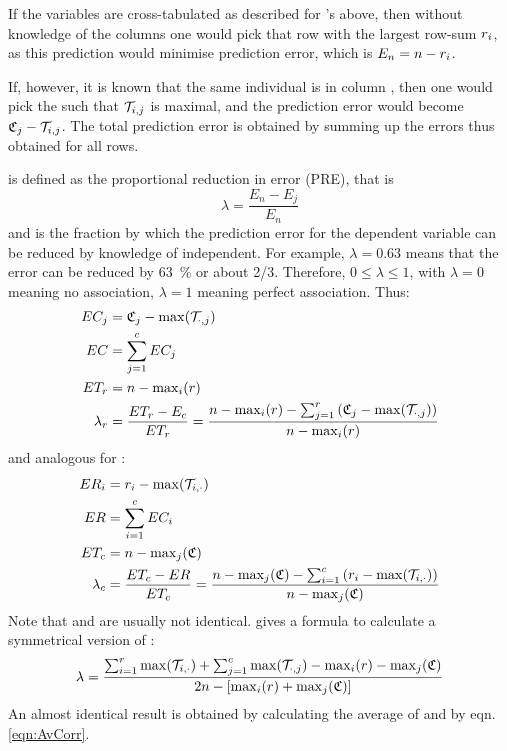 \begin{refsection}
If the variables are cross-tabulated as described for 's  above, then without knowledge of the columns one would pick that row  with the largest row-sum \(r_i \), as this prediction would minimise prediction error, which is \(E_n = n - r_i \).

If, however, it is known that the same individual is in column , then one would pick the  such that \(\mathcal{T}_{i,j} \) is maximal, and the prediction error would become \(\mathfrak{C}_j - \mathcal{T}_{i,j} \). The total prediction error  is obtained by summing up the errors thus obtained for all rows.

\skalar{\lambda} is defined as the proportional reduction in error (PRE), that is
\begin{equation}
  \lambda = \frac{E_n - E_j}{E_n}
\end{equation}
and is the fraction by which the prediction error for the dependent variable can be reduced by knowledge of independent. For example, \(\lambda = 0.63 \) means that the error can be reduced by \SI{63}{\%} or about 2/3. Therefore, \(0 \leq \lambda \leq 1 \), with \(\lambda = 0 \) meaning no association, \(\lambda = 1 \) meaning perfect association. Thus:
\begin{align}
  EC_j &= \mathfrak{C}_j - \mathrm{max}(\mathcal{T}_{\cdot,j}) \\
  EC   &= \sum_{j=1}^c{EC_j} \\
  ET_r &= n - \mathrm{max}_i(r) \\
  \lambda_r &= \frac{ET_r - E_c}{ET_r} = \frac{n - \mathrm{max}_i(r) - \sum_{j=1}^r{(\mathfrak{C}_j -\mathrm{max}(\mathcal{T}_{\cdot,j}))}}{n - \mathrm{max}_i(r)}
\end{align}
and analogous for :
\begin{align}
  ER_i &= r_i - \mathrm{max}(\mathcal{T}_{i,\cdot}) \\
  ER   &= \sum_{i=1}^c{EC_i} \\
  ET_c &= n - \mathrm{max}_j(\mathfrak{C}) \\
  \lambda_c &= \frac{ET_c - ER}{ET_c} = \frac{n - \mathrm{max}_j(\mathfrak{C}) - \sum_{i=1}^c{(r_i -\mathrm{max}(\mathcal{T}_{i,\cdot}))}}{n - \mathrm{max}_j(\mathfrak{C})}
\end{align}
Note that  and  are usually not identical. \parencite{Goo-54} gives a formula to calculate a symmetrical version of \skalar{\lambda}:
\begin{equation}
  \lambda = \frac{\sum_{i=1}^r{\mathrm{max}(\mathcal{T}_{i,\cdot})} + \sum_{j=1}^c{\mathrm{max}(\mathcal{T}_{\cdot,j})} - \mathrm{max}_i(r) - \mathrm{max}_j(\mathfrak{C})}{2n - [\mathrm{max}_i(r) + \mathrm{max}_j(\mathfrak{C})]}
\end{equation}
An almost identical result is obtained by calculating the average of  and  by eqn. \ref{eqn:AvCorr}.


\end{refsection}
